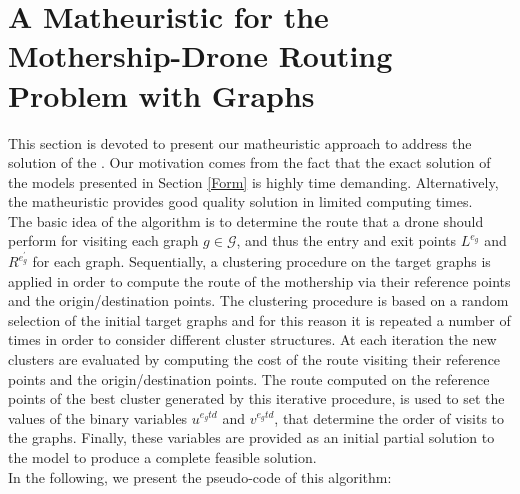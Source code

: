 \section{A Matheuristic for the Mothership-Drone Routing Problem with Graphs}\label{Math}
\noindent
This section is devoted to present our matheuristic approach to address the solution of the \AMD. Our motivation comes from the fact that the exact solution of the models presented in Section \ref{Form} is highly time demanding. Alternatively, the matheuristic provides good quality solution in limited computing times.\\
\noindent
The basic idea of the algorithm is to determine the route that a drone should perform for visiting each graph $g \in \mathcal{G}$, and thus the entry and exit points $L^{e_{g}}$ and $R^{e^{'}_{g}}$ for each graph.
Sequentially, a clustering procedure on the target graphs is applied in order to compute the route of the mothership via their reference points and the origin/destination points.
The clustering procedure is based on a random selection of the initial target graphs and for this reason it is repeated a number of times in order to consider different cluster structures. At each iteration the new clusters are evaluated by computing the cost of the route visiting their reference points and the origin/destination points. 
The route computed on the reference points of the best cluster generated by this iterative procedure, is used to set the values of the binary variables $u^{e_gtd}$ and $v^{e_gtd}$, that determine the order of visits to the graphs. Finally, these variables are provided as an initial partial solution to the \AMD\xspace model to produce a complete feasible solution.\\
In the following, we present the pseudo-code of this algorithm:




